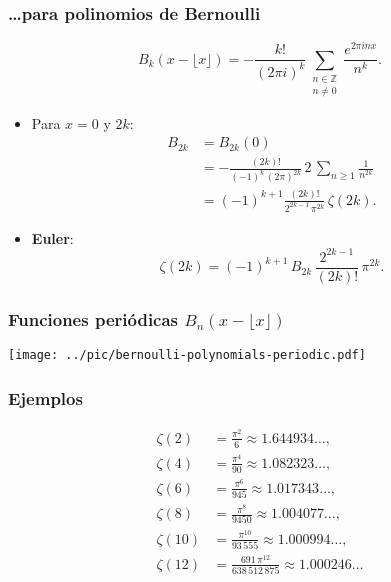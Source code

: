 \documentclass[handout]{beamer}
\begin{document}

\begin{frame}
  \frametitle{\dots{}para polinomios de Bernoulli}

  \[ B_k (x - \lfloor x\rfloor) = -\frac{k!}{(2\pi i)^k}\sum_{\substack{n\in \mathbb{Z} \\ n \ne 0}} \frac{e^{2\pi i n x}}{n^k}. \]

  \begin{itemize}
  \item<2-> Para $x = 0$ y $2k$:
    \begin{align*}
      B_{2k} & = B_{2k} (0) \\
      & = -\frac{(2k)!}{(-1)^k\,(2\pi)^{2k}} \, 2\,\sum_{n \ge 1} \frac{1}{n^{2k}} \\
      & = (-1)^{k+1}\frac{(2k)!}{2^{2k-1}\,\pi^{2k}}\,\zeta (2k).
    \end{align*}

  \item<3-> \textbf{Euler}:
    $$\zeta (2k) = (-1)^{k+1} \, B_{2k}\,\frac{2^{2k-1}}{(2k)!}\,\pi^{2k}.$$
  \end{itemize}
\end{frame}


\begin{frame}
  \frametitle{Funciones periódicas $B_n (x - \lfloor x\rfloor)$}

  \begin{center}
    \texttt{[image: ../pic/bernoulli-polynomials-periodic.pdf]}
  \end{center}
\end{frame}


\begin{frame}
  \frametitle{Ejemplos}

  \begin{align*}
    \zeta (2) & = \frac{\pi^2}{6} \approx 1.644934\ldots, \\
    \zeta (4) & = \frac{\pi^4}{90} \approx 1.082323\ldots, \\
    \zeta (6) & = \frac{\pi^6}{945}  \approx 1.017343\ldots, \\
    \zeta (8) & = \frac{\pi^8}{9450} \approx 1.004077\ldots, \\
    \zeta (10) & = \frac{\pi^{10}}{93\,555} \approx 1.000994\ldots, \\
    \zeta (12) & = \frac{691\,\pi^{12}}{638\,512\,875} \approx 1.000246\ldots
  \end{align*}
\end{frame}
\end{document}
